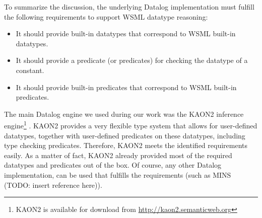 To summarize the discussion, the underlying Datalog implementation
must fulfill the following requirements to support WSML datatype
reasoning:
\begin{itemize}
    \item It should provide built-in datatypes that correspond to WSML built-in datatypes.
    \item It should provide a predicate (or predicates) for checking the datatype of a constant.
    \item It should provide built-in predicates that correspond to WSML built-in predicates.
\end{itemize}

The main Datalog engine we used during our work was the KAON2
inference engine\footnote{KAON2 is available for download from
\url{http://kaon2.semanticweb.org}} \cite{hustadt04reducing}.
KAON2 provides a very flexible type system that allows for
user-defined datatypes, together with user-defined predicates on
these datatypes, including type checking predicates. Therefore,
KAON2 meets the identified requirements easily. As a matter of
fact, KAON2 already provided most of the required datatypes and
predicates out of the box. Of course, any other Datalog
implementation, can be used that fulfills the requirements (such
as MINS (TODO: insert reference here)).
